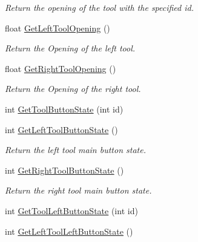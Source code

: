 \begin{DoxyCompactItemize}
\begin{DoxyCompactList}\small\item\em Return the opening of the tool with the specified id. \item\end{DoxyCompactList}\item 
\hypertarget{classvtkIHP_a95cd78b39f4081a076bd4ed2d6461665}{
float \hyperlink{classvtkIHP_a95cd78b39f4081a076bd4ed2d6461665}{GetLeftToolOpening} ()}
\label{classvtkIHP_a95cd78b39f4081a076bd4ed2d6461665}

\begin{DoxyCompactList}\small\item\em Return the Opening of the left tool. \item\end{DoxyCompactList}\item 
\hypertarget{classvtkIHP_ad8a083f4ff616190041b403f9db80fa2}{
float \hyperlink{classvtkIHP_ad8a083f4ff616190041b403f9db80fa2}{GetRightToolOpening} ()}
\label{classvtkIHP_ad8a083f4ff616190041b403f9db80fa2}

\begin{DoxyCompactList}\small\item\em Return the Opening of the right tool. \item\end{DoxyCompactList}\item 
int \hyperlink{classvtkIHP_a5679a7f0539274650ba046cbf5e0535a}{GetToolButtonState} (int id)
\item 
\hypertarget{classvtkIHP_ac2d6929beadef05098c58e074986225c}{
int \hyperlink{classvtkIHP_ac2d6929beadef05098c58e074986225c}{GetLeftToolButtonState} ()}
\label{classvtkIHP_ac2d6929beadef05098c58e074986225c}

\begin{DoxyCompactList}\small\item\em Return the left tool main button state. \item\end{DoxyCompactList}\item 
\hypertarget{classvtkIHP_acadda8d0d05c54dfe3415088404b3c06}{
int \hyperlink{classvtkIHP_acadda8d0d05c54dfe3415088404b3c06}{GetRightToolButtonState} ()}
\label{classvtkIHP_acadda8d0d05c54dfe3415088404b3c06}

\begin{DoxyCompactList}\small\item\em Return the right tool main button state. \item\end{DoxyCompactList}\item 
int \hyperlink{classvtkIHP_af7a915155ec7b4e77ea788080ec7bda9}{GetToolLeftButtonState} (int id)
\item 
\hypertarget{classvtkIHP_ac5a7c72d0ee9585abdcaeb23955f2bea}{
int \hyperlink{classvtkIHP_ac5a7c72d0ee9585abdcaeb23955f2bea}{GetLeftToolLeftButtonState} ()}
\label{classvtkIHP_ac5a7c72d0ee9585abdcaeb23955f2bea}


\end{DoxyCompactItemize}
